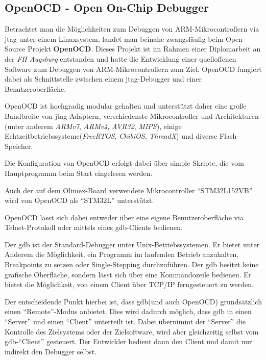\subsection{OpenOCD - Open On-Chip Debugger}
Betrachtet man die Möglichkeiten zum Debuggen von ARM-Mikrocontrollern via
\gls{jtag} unter einem Linuxsystem, landet man beinahe zwangsläufig beim Open
Source Projekt \textbf{OpenOCD}. Dieses Projekt ist im Rahmen einer
Diplomarbeit\cite{OOCD2} an der \emph{FH Augsburg} entstanden und hatte die
Entwicklung einer quelloffenen Software zum Debuggen von ARM-Mikrocontrollern zum Ziel.
OpenOCD fungiert dabei als Schnittstelle zwischen einem \gls{jtag}-Debugger und
einer Benutzeroberfläche.

OpenOCD ist hochgradig modular gehalten und unterstützt daher eine große
Bandbreite von \gls{jtag}-Adaptern, verschiedenste Mikrocontroller und
Architekturen (unter anderem \emph{ARMv7}, \emph{ARMv4}, \emph{AVR32},
\emph{MIPS}), einige Echtzeitbetriebssysteme(\emph{FreeRTOS}, \emph{ChibiOS},
\emph{ThreadX}) und diverse Flash-Speicher.

Die Konfiguration von OpenOCD erfolgt dabei über simple Skripte, die vom
Hauptprogramm beim Start eingelesen werden.

Auch der auf dem Olimex-Board verwendete Mikrocontroller "`STM32L152VB"' wird
von OpenOCD als "`STM32L"' unterstützt.

OpenOCD lässt sich dabei entweder über eine eigene Benutzeroberfläche via
Telnet-Protokoll oder mittels eines \gls{gdb}-Clients bedienen.

\begin{definition}[GDB]
Der \gls{gdb} ist der Standard-Debugger unter
Unix-Betriebssystemen. Er bietet unter Anderem die Möglichkeit, ein Programm im
laufenden Betrieb anzuhalten, Breakpoints zu setzen oder Single-Stepping
durchzuführen. Der \gls{gdb} besitzt keine grafische Oberfläche, sondern
lässt sich über eine Kommandozeile bedienen. Er bietet die Möglichkeit, von
einem Client über TCP/IP ferngesteuert zu werden. 
\end{definition}

Der entscheidende Punkt hierbei ist, dass \gls{gdb}(und auch OpenOCD)
grundsätzlich einen "`Remote"'-Modus anbietet. Dies wird dadurch möglich, dass
\gls{gdb} in einen "`Server"' und einen "`Client"' unterteilt ist. Dabei
übernimmt der "`Server"' die Kontrolle des Zielsystems oder der Zielsoftware,
wird aber gleichzeitig selbst vom \gls{gdb}-"`Client"' gesteuert. Der Entwickler
bedient dann den Client und damit nur indirekt den Debugger selbst.

